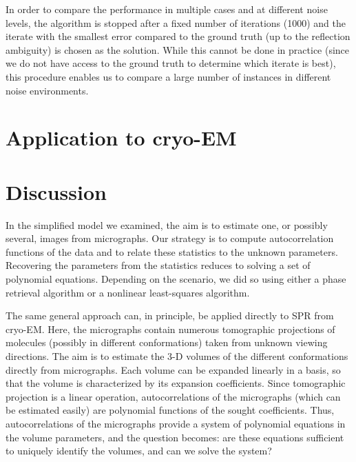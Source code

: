 \documentclass[english,11pt]{article}
\newcommand{\1}{\mathbf{1}}
\newcommand{\TODO}[1]{{\color{red}{[#1]}}}
\numberwithin{equation}{section}
\theoremstyle{plain}
\theoremstyle{definition}
\theoremstyle{remark}
\theoremstyle{plain}
\theoremstyle{remark}
\theoremstyle{plain}
\theoremstyle{plain}
\begin{document}
In order to compare the performance in multiple cases and at different noise levels, the algorithm is stopped after a fixed number of iterations (1000) and the iterate with the smallest error compared to the ground truth (up to the reflection ambiguity) is chosen as the solution. While this cannot be done in practice (since we do not have access to the ground truth to determine which iterate is best), this procedure enables us to compare a large number of instances in different noise environments. \TODO{Note the last two sentences!}

\section{Application to cryo-EM}
\TODO{should be concise; the details are in the Nature paper}

\section{Discussion}

In the simplified model we examined, the aim is to estimate one, or possibly several, images from micrographs. Our strategy is to compute autocorrelation functions of the data and to relate these statistics to the unknown parameters. Recovering the parameters from the statistics reduces to solving a set of polynomial equations. Depending on the scenario, we did so using either a phase retrieval algorithm or a nonlinear least-squares algorithm.

The same general approach can, in principle, be applied directly to SPR from cryo-EM. Here, the micrographs contain numerous tomographic projections of molecules (possibly in different conformations) taken from unknown viewing directions. The aim is to estimate the 3-D volumes of the different conformations directly from micrographs. Each volume can be expanded linearly in a basis, so that the volume is characterized by its expansion coefficients. Since tomographic projection is a linear operation, autocorrelations of the micrographs (which can be estimated easily) are polynomial functions of the sought coefficients. Thus, autocorrelations of the micrographs provide a system of polynomial equations in the volume parameters, and the question becomes: are these equations sufficient to uniquely identify the volumes, and can we solve the system?
\end{document}
